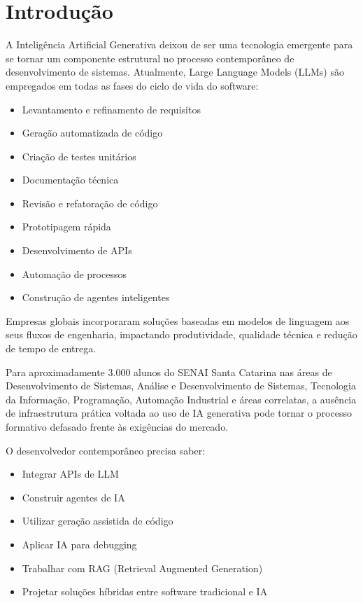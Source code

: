 \documentclass[12pt,a4paper,]{abntex2}
\begin{document}

\imprimirfolhaderosto*

\tableofcontents*
\clearpage

\chapter{Introdução}

A Inteligência Artificial Generativa deixou de ser uma tecnologia emergente para se tornar um componente estrutural no processo contemporâneo de desenvolvimento de sistemas. Atualmente, Large Language Models (LLMs) são empregados em todas as fases do ciclo de vida do software:

\begin{itemize}
\item Levantamento e refinamento de requisitos
\item Geração automatizada de código
\item Criação de testes unitários
\item Documentação técnica
\item Revisão e refatoração de código
\item Prototipagem rápida
\item Desenvolvimento de APIs
\item Automação de processos
\item Construção de agentes inteligentes
\end{itemize}

Empresas globais incorporaram soluções baseadas em modelos de linguagem aos seus fluxos de engenharia, impactando produtividade, qualidade técnica e redução de tempo de entrega.

Para aproximadamente 3.000 alunos do SENAI Santa Catarina nas áreas de Desenvolvimento de Sistemas, Análise e Desenvolvimento de Sistemas, Tecnologia da Informação, Programação, Automação Industrial e áreas correlatas, a ausência de infraestrutura prática voltada ao uso de IA generativa pode tornar o processo formativo defasado frente às exigências do mercado.

O desenvolvedor contemporâneo precisa saber:

\begin{itemize}
\item Integrar APIs de LLM
\item Construir agentes de IA
\item Utilizar geração assistida de código
\item Aplicar IA para debugging
\item Trabalhar com RAG (Retrieval Augmented Generation)
\item Projetar soluções híbridas entre software tradicional e IA
\end{itemize}
\end{document}
